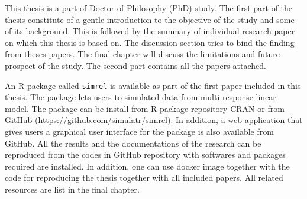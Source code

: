 This thesis is a part of Doctor of Philosophy (PhD) study. The first
part of the thesis constitute of a gentle introduction to the objective
of the study and some of its background. This is followed by the summary
of individual research paper on which this thesis is based on. The
discussion section tries to bind the finding from theses papers. The
final chapter will discuss the limitations and future prospect of the
study. The second part contains all the papers attached.

An R-package called \texttt{simrel} is available as part of the first
paper included in this thesis. The package lets users to simulated data
from multi-response linear model. The package can be install from
R-package repository CRAN or from GitHub
(\url{https://github.com/simulatr/simrel}). In addition, a web
application that gives users a graphical user interface for the package
is also available from GitHub. All the results and the documentations of
the research can be reproduced from the codes in GitHub repository with
softwares and packages required are installed. In addition, one can use
docker image together with the code for reproducing the thesis together
with all included papers. All related resources are list in the final
chapter.
